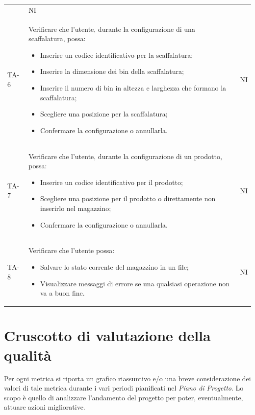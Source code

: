 \begin{xltabular}{0.9\textwidth}{X | p{0.7\textwidth} | X}
\begin{itemize}
    \end{itemize} 
    & NI \\
    TA-6 & Verificare che l'utente, durante la configurazione di una scaffalatura, possa:
    \begin{itemize}
        \item Inserire un codice identificativo per la scaffalatura;
        \item Inserire la dimensione dei bin della scaffalatura;
        \item Inserire il numero di bin in altezza e larghezza che formano la scaffalatura;
        \item Scegliere una posizione per la scaffalatura;
        \item Confermare la configurazione o annullarla.
    \end{itemize} 
    & NI \\
    TA-7 & Verificare che l'utente, durante la configurazione di un prodotto, possa:
    \begin{itemize}
        \item Inserire un codice identificativo per il prodotto;
        \item Scegliere una posizione per il prodotto o direttamente non inserirlo nel magazzino;
        \item Confermare la configurazione o annullarla.
    \end{itemize} 
    & NI \\
    TA-8 & Verificare che l'utente possa:
    \begin{itemize}
        \item Salvare lo stato corrente del magazzino in un file;
        \item Visualizzare messaggi di errore se una qualsiasi operazione non va a buon fine.
    \end{itemize} 
    & NI \\
    \hline
\end{xltabular}


\newpage
\section{Cruscotto di valutazione della qualità}\label{resoconto}
Per ogni metrica si riporta un grafico riassuntivo e/o una breve considerazione dei valori di tale metrica durante i vari periodi pianificati nel \textit{Piano di Progetto}. Lo scopo è quello di analizzare l'andamento del progetto per poter, eventualmente, attuare azioni migliorative.

